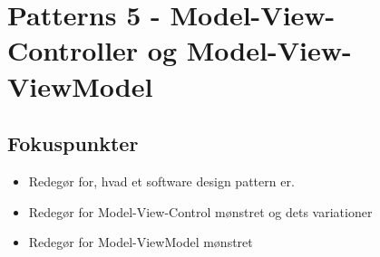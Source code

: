 \section{Patterns 5 - Model-View-Controller og Model-View-ViewModel}

\subsection{Fokuspunkter}

\begin{itemize}
	\item Redegør for, hvad et software design pattern er.
	\item Redegør for Model-View-Control mønstret og dets variationer
	\item Redegør for Model-ViewModel mønstret
\end{itemize}

